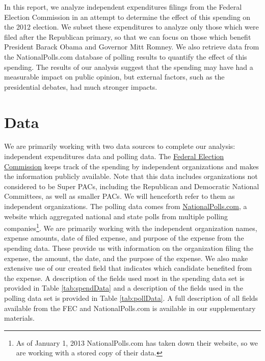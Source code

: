\documentclass[11pt]{article}\usepackage{graphicx, color}
\begin{document}
In this report, we analyze independent expenditures filings from the Federal Election Commission in an attempt to determine the effect of this spending on the 2012 election. We subset these expenditures to analyze only those which were filed after the Republican primary, so that we can focus on those which benefit President Barack Obama and Governor Mitt Romney. We also retrieve data from the NationalPolls.com database of polling results to quantify the effect of this spending. The results of our analysis suggest that the spending may have had a measurable impact on public opinion, but external factors, such as the presidential debates, had much stronger impacts.






\section{Data}
We are primarily working with two data sources to complete our analysis: independent expenditures data and polling data. The \href{http://www.fec.gov/data/IndependentExpenditure.do?format=html&cf=superPAC}{Federal Election Commission} keeps track of the spending by independent organizations and makes the information publicly available.  Note that this data includes organizations not considered to be Super PACs, including the Republican and Democratic National Committees, as well as smaller PACs.  We will henceforth refer to them as independent organizations. The polling data comes from \href{http://nationalpolls.com/}{NationalPolls.com}, a website which aggregated national and state polls from multiple polling companies\footnote{As of January 1, 2013 NationalPolls.com has taken down their website, so we are working with a stored copy of their data.}.  We are primarily working with the independent organization names, expense amounts, date of filed expense, and purpose of the expense from the spending data. These provide us with information on the organization filing the expense, the amount, the date, and the purpose of the expense. We also make extensive use of our created field that indicates which candidate benefited from the expense. A description of the fields used most in the spending data set is provided in Table \ref{tab:spendData} and a description of the fields used in the polling data set is provided in Table \ref{tab:pollData}. A full description of all fields available from the FEC and NationalPolls.com is available in our supplementary materials.
\end{document}

